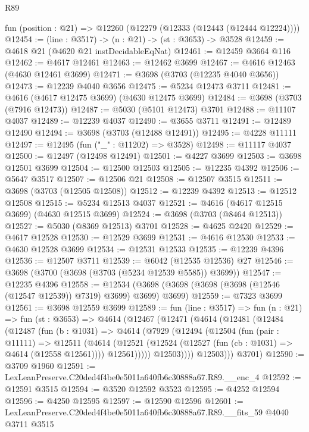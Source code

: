 \begin{lexlean}{R89}
\begin{coremodule}
  fun (position : @21) => @12260 (@12279 (@12333 (@12443 (@12444 @12224))))
@12454 := (line : @3517) -> (n : @21) -> (st : @3653) -> @3528
@12459 := @4618 @21 (@4620 @21 instDecidableEqNat)
@12461 := @12459 @3664 @116
@12462 := @4617 @12461
@12463 := @12462 @3699
@12467 := @4616 @12463 (@4630 @12461 @3699)
@12471 := @3698 (@3703 (@12235 @4040 @3656))
@12473 := @12239 @4040 @3656
@12475 := @5234 @12473 @3711
@12481 := @4616 (@4617 @12475 @3699) (@4630 @12475 @3699)
@12484 := @3698 (@3703 (@7916 @12473))
@12487 := @5030 (@5101 @12473) @3701
@12488 := @11107 @4037
@12489 := @12239 @4037
@12490 := @3655 @3711
@12491 := @12489 @12490
@12494 := @3698 (@3703 (@12488 @12491))
@12495 := @4228 @11111
@12497 := @12495 (fun ("_" : @11202) => @3528)
@12498 := @11117 @4037
@12500 := @12497 (@12498 @12491)
@12501 := @4227 @3699
@12503 := @3698 @12501 @3699
@12504 := @12500 @12503
@12505 := @12235 @4392
@12506 := @5647 @3517
@12507 := @12506 @21
@12508 := @12507 @3515
@12511 := @3698 (@3703 (@12505 @12508))
@12512 := @12239 @4392
@12513 := @12512 @12508
@12515 := @5234 @12513 @4037
@12521 := @4616 (@4617 @12515 @3699) (@4630 @12515 @3699)
@12524 := @3698 (@3703 (@8464 @12513))
@12527 := @5030 (@8369 @12513) @3701
@12528 := @4625 @2420
@12529 := @4617 @12528
@12530 := @12529 @3699
@12531 := @4616 @12530
@12533 := @4630 @12528 @3699
@12534 := @12531 @12533
@12535 := @12239 @4396
@12536 := @12507 @3711
@12539 := @6042 (@12535 @12536) @27
@12546 := @3698 (@3700 (@3698 (@3703 (@5234 @12539 @5585)) @3699))
@12547 := @12235 @4396
@12558 := @12534 (@3698 (@3698 (@3698 (@3698 (@12546 (@12547 @12539)) @7319) @3699) @3699) @3699)
@12559 := @7323 @3699
@12561 := @3698 @12559 @3699
@12589 := fun (line : @3517) =>
  fun (n : @21) =>
  fun (st : @3653) =>
  @4614
    (@12467
      (@12471
        (@4614
          (@12481
            (@12484
              (@12487
                (fun (b : @1031) =>
                @4614
                  (@7929
                    (@12494
                      (@12504
                        (fun (pair : @11111) =>
                        @12511
                          (@4614
                            (@12521
                              (@12524 (@12527 (fun (cb : @1031) => @4614 (@12558 @12561))))
                              @12561)))))
                    @12503))))
            @12503)))
      @3701)
@12590 := @3709 @1960
@12591 := LexLeanPreserve.C20ded4f4be0e5011a640fb6c30888a67.R89.__enc_4
@12592 := @12591 @3515
@12594 := @3520 @12592 @3523
@12595 := @4252 @12594
@12596 := @4250 @12595
@12597 := @12590 @12596
@12601 := LexLeanPreserve.C20ded4f4be0e5011a640fb6c30888a67.R89.__fits_59 @4040 @3711 @3515

\end{coremodule}
\end{lexlean}
